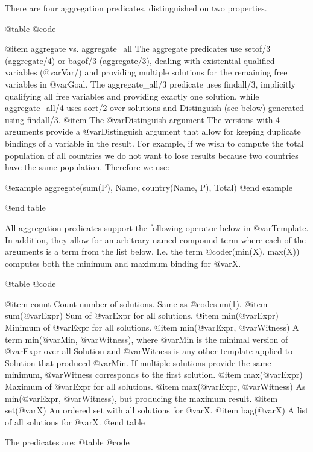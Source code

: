 {{{{{{{{{There are four aggregation predicates, distinguished on two properties.

@table @code

@item aggregate vs. aggregate_all
    The aggregate predicates use setof/3 (aggregate/4) or bagof/3
    (aggregate/3), dealing with existential qualified variables
    (@var{Var}/) and providing multiple solutions for the
    remaining free variables in @var{Goal}. The aggregate_all/3
    predicate uses findall/3, implicitly qualifying all free variables
    and providing exactly one solution, while aggregate_all/4 uses
    sort/2 over solutions and Distinguish (see below) generated using
    findall/3. 
@item The @var{Distinguish} argument
    The versions with 4 arguments provide a @var{Distinguish} argument
    that allow for keeping duplicate bindings of a variable in the
    result. For example, if we wish to compute the total population of
    all countries we do not want to lose results because two countries
    have the same population. Therefore we use:

@example
        aggregate(sum(P), Name, country(Name, P), Total)
@end example

@end table

All aggregation predicates support the following operator below in
@var{Template}. In addition, they allow for an arbitrary named compound
term where each of the arguments is a term from the list below. I.e. the
term @code{r(min(X), max(X))} computes both the minimum and maximum
binding for @var{X}.

@table @code

@item count
    Count number of solutions. Same as @code{sum(1)}. 
@item sum(@var{Expr})
    Sum of @var{Expr} for all solutions. 
@item min(@var{Expr})
    Minimum of @var{Expr} for all solutions. 
@item min(@var{Expr}, @var{Witness})
    A term min(@var{Min}, @var{Witness}), where @var{Min} is the minimal version of @var{Expr}
    over all Solution and @var{Witness} is any other template applied to
    Solution that produced @var{Min}. If multiple solutions provide the same
    minimum, @var{Witness} corresponds to the first solution. 
@item max(@var{Expr})
    Maximum of @var{Expr} for all solutions. 
@item max(@var{Expr}, @var{Witness})
    As min(@var{Expr}, @var{Witness}), but producing the maximum result. 
@item set(@var{X})
    An ordered set with all solutions for @var{X}. 
@item bag(@var{X})
    A list of all solutions for @var{X}. 
@end table

The predicates are:
@table @code

}}}}}}}}}
